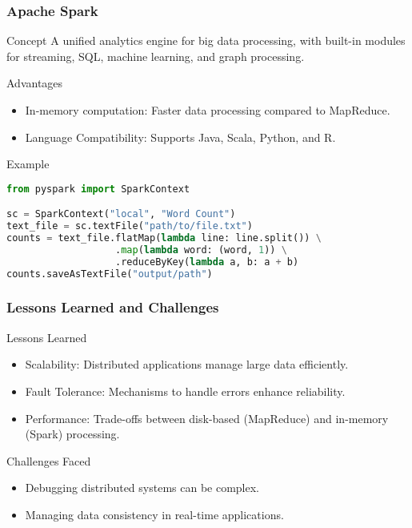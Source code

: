 \documentclass[aspectratio=169]{beamer}
\begin{document}
\begin{frame}[fragile]
    \frametitle{Apache Spark}

    \begin{block}{Concept}
        A unified analytics engine for big data processing, with built-in modules for streaming, SQL, machine learning, and graph processing.
    \end{block}

    \begin{block}{Advantages}
        \begin{itemize}
            \item In-memory computation: Faster data processing compared to MapReduce.
            \item Language Compatibility: Supports Java, Scala, Python, and R.
        \end{itemize}
    \end{block}

    \begin{block}{Example}
        \begin{lstlisting}[language=Python]
from pyspark import SparkContext

sc = SparkContext("local", "Word Count")
text_file = sc.textFile("path/to/file.txt")
counts = text_file.flatMap(lambda line: line.split()) \
                   .map(lambda word: (word, 1)) \
                   .reduceByKey(lambda a, b: a + b)
counts.saveAsTextFile("output/path")
        \end{lstlisting}
    \end{block}  
\end{frame}

\begin{frame}[fragile]
    \frametitle{Lessons Learned and Challenges}

    \begin{block}{Lessons Learned}
        \begin{itemize}
            \item Scalability: Distributed applications manage large data efficiently.
            \item Fault Tolerance: Mechanisms to handle errors enhance reliability.
            \item Performance: Trade-offs between disk-based (MapReduce) and in-memory (Spark) processing.
        \end{itemize}
    \end{block}
    
    \begin{block}{Challenges Faced}
        \begin{itemize}
            \item Debugging distributed systems can be complex.
            \item Managing data consistency in real-time applications.
        \end{itemize}
    \end{block}
\end{frame}
\end{document}
